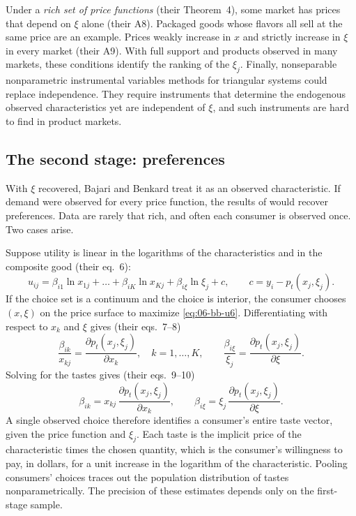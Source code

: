 Under a \emph{rich set of price functions} (their Theorem~4), some market has prices that depend on $\xi$ alone (their A8).
Packaged goods whose flavors all sell at the same price are an example. Prices weakly increase in $x$ and strictly increase
in $\xi$ in every market (their A9). With full support and products observed in many markets, these conditions identify the
ranking of the $\xi_j$. Finally, nonseparable nonparametric instrumental variables methods for triangular systems
\citep{ImbensNewey2009} could replace independence. They require instruments that determine the endogenous observed
characteristics yet are independent of $\xi$, and such instruments are hard to find in product markets.

\subsection{The second stage: preferences}\label{sec:06-bb-secondstage}

With $\xi$ recovered, Bajari and Benkard treat it as an observed characteristic. If demand were observed for every price
function, the results of \citet{MasColell1977} would recover preferences. Data are rarely that rich, and often each consumer
is observed once. Two cases arise.

Suppose utility is linear in the logarithms of the characteristics and in the composite good (their eq.~6):
\begin{equation}\label{eq:06-bb-u6}
  u_{ij} = \beta_{i1}\ln x_{1j} + \dots + \beta_{iK}\ln x_{Kj} + \beta_{i\xi}\ln \xi_j + c , \qquad c = y_i - p_t(x_j, \xi_j) .
\end{equation}
If the choice set is a continuum and the choice is interior, the consumer chooses $(x, \xi)$ on the price surface to maximize
\eqref{eq:06-bb-u6}. Differentiating with respect to $x_k$ and $\xi$ gives (their eqs.~7--8)
\begin{equation*}
  \frac{\beta_{ik}}{x_{kj}} = \frac{\partial p_t(x_j, \xi_j)}{\partial x_k}, \quad k = 1, \dots, K, \qquad
  \frac{\beta_{i\xi}}{\xi_j} = \frac{\partial p_t(x_j, \xi_j)}{\partial \xi} .
\end{equation*}
Solving for the tastes gives (their eqs.~9--10)
\begin{equation}\label{eq:06-bb-tastes}
  \beta_{ik} = x_{kj}\,\frac{\partial p_t(x_j, \xi_j)}{\partial x_k}, \qquad
  \beta_{i\xi} = \xi_j\,\frac{\partial p_t(x_j, \xi_j)}{\partial \xi} .
\end{equation}
A single observed choice therefore identifies a consumer's entire taste vector, given the price function and $\xi_j$. Each
taste is the implicit price of the characteristic times the chosen quantity, which is the consumer's willingness to pay, in
dollars, for a unit increase in the logarithm of the characteristic. Pooling consumers' choices traces out the population
distribution of tastes nonparametrically. The precision of these estimates depends only on the first-stage sample.

